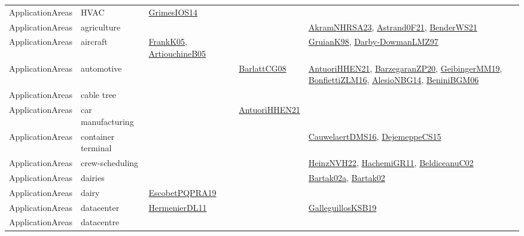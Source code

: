 {\begin{longtable}{lp{3cm}>{\raggedright}p{6cm}>{\raggedright}p{6cm}p{8cm}}
ApplicationAreas & HVAC & \href{articles/GrimesIOS14.pdf}{GrimesIOS14}\cite{GrimesIOS14} &  & \\
ApplicationAreas & agriculture &  &  & \href{articles/AkramNHRSA23.pdf}{AkramNHRSA23}\cite{AkramNHRSA23}, \href{papers/Astrand0F21.pdf}{Astrand0F21}\cite{Astrand0F21}, \href{papers/BenderWS21.pdf}{BenderWS21}\cite{BenderWS21}\\
ApplicationAreas & aircraft & \href{papers/FrankK05.pdf}{FrankK05}\cite{FrankK05}, \href{papers/ArtiouchineB05.pdf}{ArtiouchineB05}\cite{ArtiouchineB05} &  & \href{papers/GruianK98.pdf}{GruianK98}\cite{GruianK98}, \href{articles/Darby-DowmanLMZ97.pdf}{Darby-DowmanLMZ97}\cite{Darby-DowmanLMZ97}\\
ApplicationAreas & automotive &  & \href{papers/BarlattCG08.pdf}{BarlattCG08}\cite{BarlattCG08} & \href{papers/AntuoriHHEN21.pdf}{AntuoriHHEN21}\cite{AntuoriHHEN21}, \href{papers/BarzegaranZP20.pdf}{BarzegaranZP20}\cite{BarzegaranZP20}, \href{papers/GeibingerMM19.pdf}{GeibingerMM19}\cite{GeibingerMM19}, \href{papers/BonfiettiZLM16.pdf}{BonfiettiZLM16}\cite{BonfiettiZLM16}, \href{papers/AlesioNBG14.pdf}{AlesioNBG14}\cite{AlesioNBG14}, \href{papers/BeniniBGM06.pdf}{BeniniBGM06}\cite{BeniniBGM06}\\
ApplicationAreas & cable tree &  &  & \\
ApplicationAreas & car manufacturing &  & \href{papers/AntuoriHHEN21.pdf}{AntuoriHHEN21}\cite{AntuoriHHEN21} & \\
ApplicationAreas & container terminal &  &  & \href{papers/CauwelaertDMS16.pdf}{CauwelaertDMS16}\cite{CauwelaertDMS16}, \href{papers/DejemeppeCS15.pdf}{DejemeppeCS15}\cite{DejemeppeCS15}\\
ApplicationAreas & crew-scheduling &  &  & \href{articles/HeinzNVH22.pdf}{HeinzNVH22}\cite{HeinzNVH22}, \href{articles/HachemiGR11.pdf}{HachemiGR11}\cite{HachemiGR11}, \href{papers/BeldiceanuC02.pdf}{BeldiceanuC02}\cite{BeldiceanuC02}\\
ApplicationAreas & dairies &  &  & \href{papers/Bartak02a.pdf}{Bartak02a}\cite{Bartak02a}, \href{papers/Bartak02.pdf}{Bartak02}\cite{Bartak02}\\
ApplicationAreas & dairy & \href{articles/EscobetPQPRA19.pdf}{EscobetPQPRA19}\cite{EscobetPQPRA19} &  & \\
ApplicationAreas & datacenter & \href{papers/HermenierDL11.pdf}{HermenierDL11}\cite{HermenierDL11} &  & \href{papers/GalleguillosKSB19.pdf}{GalleguillosKSB19}\cite{GalleguillosKSB19}\\
ApplicationAreas & datacentre &  &  & \\

\end{longtable}}
